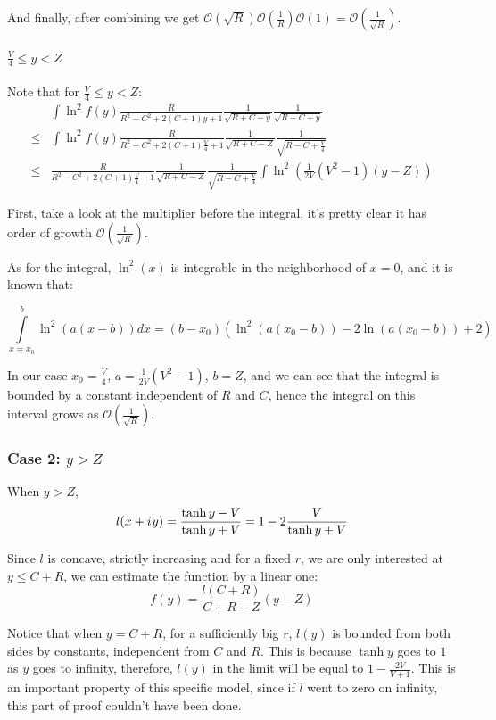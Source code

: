 \documentclass{gCOV2e}
\theoremstyle{plain}%
\theoremstyle{definition}
\theoremstyle{remark}
\newcommand{\mcO}{\mathcal{O}} %
\newcommand{\iu}{{i\mkern1mu}} %
\begin{document}
And finally, after combining we get $\mcO(\sqrt{R}) \mcO\left(\frac{1}{R}\right) \mcO(1)  = \mcO\left(\frac{1}{\sqrt{R}}\right)$.

\paragraph{$\frac{V}{4} \le y < Z$}

Note that for $\frac{V}{4} \le y < Z$:
\begin{align*}
       & \int \ln^2 f(y) \frac{R}{R^2 - C^2 + 2 (C + 1) y + 1} \frac{1}{\sqrt{R + C - y}} \frac{1}{\sqrt{R - C + y}} 
\\ \le & \int \ln^2 f(y) \frac{R}{R^2 - C^2 + 2 (C + 1) \frac{V}{4} + 1} \frac{1}{\sqrt{R + C - Z}} \frac{1}{\sqrt{R - C + \frac{V}{4}}}
\\ \le &  \frac{R}{R^2 - C^2 + 2 (C + 1) \frac{V}{4} + 1} \frac{1}{\sqrt{R + C - Z}} \frac{1}{\sqrt{R - C + \frac{V}{4}}} \int \ln^2 \left( \frac{1}{2 V}(V^2 - 1) (y - Z) \right)
\end{align*}

First, take a look at the multiplier before the integral, it's pretty clear it has order of growth $\mcO(\frac{1}{\sqrt{R}})$.

As for the integral, $\ln^2(x)$ is integrable in the neighborhood of $x = 0$, and it is known that: %

\[
\int\limits_{x=x_0}^b \ln^2(a (x - b)) dx = (b - x_0) (\ln^2(a (x_0 - b)) - 2 \ln(a (x_0 - b)) + 2)
\]

In our case $x_0 = \frac{V}{4}$, $a = \frac{1}{2 V}(V^2 - 1)$, $b = Z$, and we can see that the integral is bounded by a constant independent of $R$ and $C$, hence the integral on this interval grows as $\mcO(\frac{1}{\sqrt{R}})$.

\subsubsection{Case 2: $y > Z$}
When $y > Z$, 
\[
l(x + \iu y) 
 = \frac{\tanh y - V}{\tanh y + V}
 = 1 - 2 \frac{V}{\tanh y + V}
\]


Since $l$ is concave, strictly increasing and for a fixed $r$, we are only interested at $y \le C + R$, we can estimate the function by a linear one: 
\[
f(y) = \frac{l(C + R)}{C + R - Z} (y - Z)
\]

Notice that when $y = C + R$, for a sufficiently big $r$, $l(y)$ is bounded from both sides by constants, independent from $C$ and $R$. This is because $\tanh y$ goes to $1$ as $y$ goes to infinity, therefore, $l(y)$ in the limit will be equal to $1 - \frac{2 V}{V + 1}$. This is an important property of this specific model, since if $l$ went to zero on infinity, this part of proof couldn't have been done.
\end{document}
